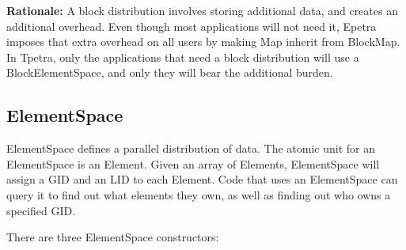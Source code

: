 \documentclass[10pt,relax]{TpetraDesign}
\begin{document}
\textbf{Rationale:} A block distribution involves storing additional data, and creates an additional overhead. Even though most applications will not need it, Epetra imposes that extra overhead on all users by making Map inherit from BlockMap. In Tpetra, only the applications that need a block distribution will use a BlockElementSpace, and only they will bear the additional burden.

%
\subsection{ElementSpace}
ElementSpace defines a parallel distribution of data. The atomic unit for an ElementSpace is an Element. Given an array of Elements, ElementSpace will assign a GID and an LID to each Element. Code that uses an ElementSpace can query it to find out what elements they own, as well as finding out who owns a specified GID.

There are three ElementSpace constructors:
\end{document}
